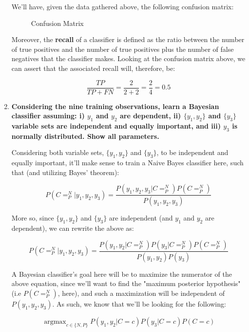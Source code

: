 \documentclass[12pt]{article}
\begin{document}
\begin{enumerate}[leftmargin=\labelsep]
        We'll have, given the data gathered above, the following confusion matrix:

        \begin{figure}[H]
          \centering
          
          \caption{Confusion Matrix}
        \end{figure}

        Moreover, the \textbf{recall} of a classifier is defined as the ratio between the number of
        true positives and the number of true positives plus the number of false negatives that the
        classifier makes. Looking at the confusion matrix above, we can assert that the associated
        recall will, therefore, be:

        $$
          \frac{TP}{TP + FN} = \frac{2}{2 + 2} = \frac{2}{4} = 0.5
        $$

        \pagebreak

  \item \textbf{Considering the nine training observations, learn a Bayesian classifier assuming:
          i) $y_1$ and $y_2$ are dependent, ii) $\{y_1 , y_2\}$ and $\{y_3 \}$ variable sets are
          independent and equally important, and iii) $y_3$ is normally distributed. Show all parameters.}

        Considering both variable sets, $\{y_1, y_2\}$ and $\{y_3\}$, to be independent and equally important,
        it'll make sense to train a Naive Bayes classifier here, such that (and utilizing
        Bayes' theorem):

        $$
          P(C = ^N_P | y_1, y_2, y_3) = \frac{P(y_1, y_2, y_3 | C = ^N_P) P(C = ^N_P)}{P(y_1, y_2, y_3)}
        $$

        More so, since $\{y_1, y_2\}$ and $\{y_3\}$ are independent (and $y_1$ and $y_2$ are dependent),
        we can rewrite the above as:

        $$
          P(C = ^N_P | y_1, y_2, y_3) = \frac{P(y_1, y_2 | C = ^N_P) P(y_3 | C = ^N_P) P(C = ^N_P)}{P(y_1, y_2) P(y_3)}
        $$

        A Bayesian classifier's goal here will be to maximize the numerator of the above equation,
        since we'll want to find the "maximum posterior hypothesis" (i.e $P(C = ^N_P)$, here), and
        such a maximization will be independent of $P(y_1, y_2, y_3)$. As such, we know that
        we'll be looking for the following:

        $$
          \operatorname{argmax}_{c \in \{N, P\}} P(y_1, y_2 | C = c) P(y_3 | C = c) P(C = c)
        $$


\end{enumerate}
\end{document}

